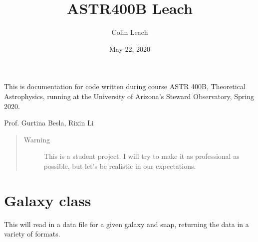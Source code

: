 \documentclass[letterpaper,10pt,english]{sphinxmanual}
\title{ASTR400B Leach}
\date{May 22, 2020}
\author{Colin Leach}
\begin{document}
\pagestyle{empty}
\sphinxmaketitle
\pagestyle{plain}
\sphinxtableofcontents
\pagestyle{normal}
\label{\detokenize{index::doc}}


This is documentation for code written during course ASTR 400B,
Theoretical Astrophysics, running at the University of Arizona’s
Steward Observatory, Spring 2020.

 Prof. Gurtina Besla,   Rixin Li

 
\begin{quote}\begin{description}
\item[{Warning}] \leavevmode
This is a student project. I will try to make it as professional as
possible, but let’s be realistic in our expectations.

\end{description}\end{quote}
\label{\detokenize{galaxy:module-galaxy.galaxy}}

\chapter{Galaxy class}
\label{\detokenize{galaxy:galaxy-class}}\label{\detokenize{galaxy::doc}}
This will read in a data file for a given galaxy and snap, returning the
data in a variety of formats.
\end{document}
